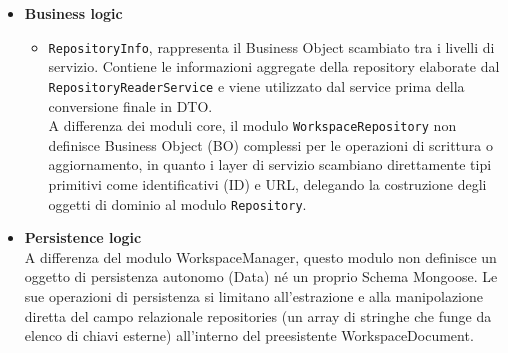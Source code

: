 \documentclass[a4paper, 11pt]{article}
\begin{document}
\begin{itemize}
  \item \textbf{Business logic}
    \begin{itemize}
      \item \texttt{RepositoryInfo}, rappresenta il Business Object scambiato tra i livelli di servizio. Contiene le informazioni aggregate della repository elaborate dal \texttt{RepositoryReaderService} e viene utilizzato dal service prima della conversione finale in DTO.\\
      A differenza dei moduli core, il modulo \texttt{WorkspaceRepository} non definisce Business Object (BO) complessi per le operazioni di scrittura o aggiornamento, in quanto i layer di servizio scambiano direttamente tipi primitivi come identificativi (ID) e URL, delegando la costruzione degli oggetti di dominio al modulo \texttt{Repository}.
    \end{itemize}

  \item \textbf{Persistence logic}\\
  A differenza del modulo WorkspaceManager, questo modulo non definisce un oggetto di persistenza autonomo (Data) né un proprio Schema Mongoose. Le sue operazioni di persistenza si limitano all'estrazione e alla manipolazione diretta del campo relazionale repositories (un array di stringhe che funge da elenco di chiavi esterne) all'interno del preesistente WorkspaceDocument.

\end{itemize}
\end{document}
